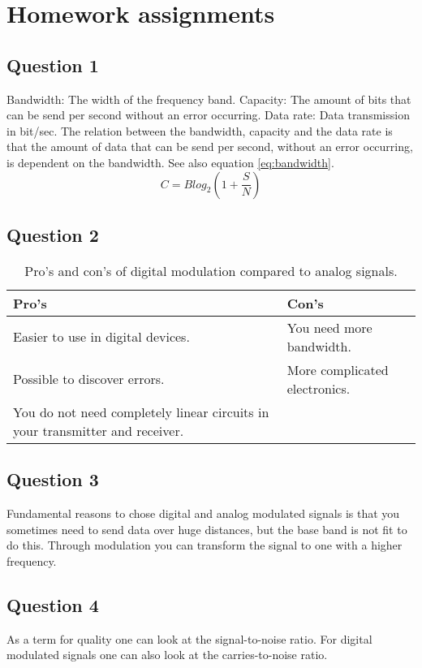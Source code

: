\documentclass[final]{scrreprt} %
\begin{document}
\section{Homework assignments}
\label{sec:homework1}
\subsection{Question 1}
Bandwidth: The width of the frequency band.
Capacity: The amount of bits that can be send per second without an error occurring. 
Data rate: Data transmission in bit/sec.
The relation between the bandwidth, capacity and the data rate is that the amount of data that can be send per second, without an error occurring, is dependent on the bandwidth. See also equation \ref{eq:bandwidth}.
\begin{equation}
\label{eq:bandwidth}
C= B log_{2}(1+\frac{S}{N})
\end{equation}
\subsection{Question 2}

\begin{table}[H]
\caption{Pro's and con's of digital modulation compared to analog signals.}
\begin{tabular}{p{}|p{}}
Pro's & Con's\\
\hline
Easier to use in digital devices. & You need more bandwidth. \\
Possible to discover errors. & More complicated electronics.\\
You do not need completely linear circuits in your transmitter and receiver. & \\
\end{tabular}
\end{table}
\subsection{Question 3}
Fundamental reasons to chose digital and analog modulated signals is that you sometimes need to send data over huge distances, but the base band is not fit to do this. Through modulation you can transform the signal to one with a higher frequency.
\subsection{Question 4}
As a term for quality one can look at the signal-to-noise ratio.
For digital modulated signals one can also look at the carries-to-noise ratio.
\end{document}
